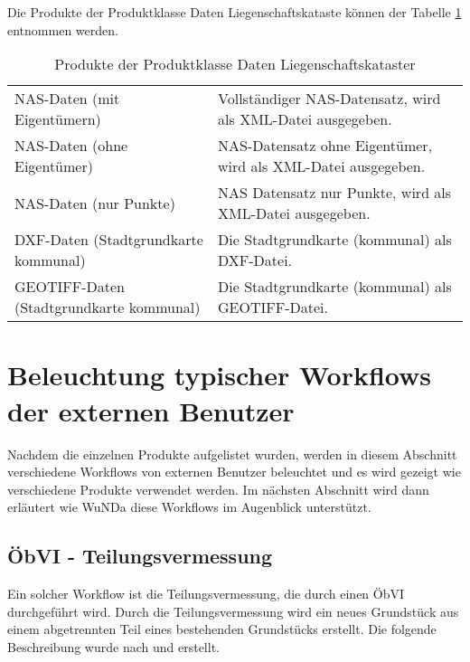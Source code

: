 Die Produkte der Produktklasse Daten Liegenschaftskataste können der Tabelle \ref{tab-daten-kataster} entnommen werden.
\begin{longtable}{|p{}|p{}|}
	\caption{Produkte der Produktklasse Daten Liegenschaftskataster} \label{tab-daten-kataster} \\
	\hline 
	\head{Produktname}  & \head{Beschreibung} \tabularnewline
	\hline 
	\endhead	
				
	\acs{NAS}-Daten (mit Eigentümern)
	&
	Vollständiger \acs{NAS}-Datensatz, wird als \acs{XML}-Datei ausgegeben. \\
	\hline
	\acs{NAS}-Daten (ohne Eigentümer)
	&
	\acs{NAS}-Datensatz ohne Eigentümer, wird als \acs{XML}-Datei ausgegeben. \\
	\hline
	\acs{NAS}-Daten (nur Punkte)
	&
	\acs{NAS} Datensatz nur Punkte, wird als \acs{XML}-Datei ausgegeben. \\
	\hline
	\acs{DXF}-Daten (Stadtgrundkarte kommunal)
	&
	Die Stadtgrundkarte (kommunal) als \acs{DXF}-Datei.  \\
	\hline
	GEOTIFF-Daten (Stadtgrundkarte kommunal)
	&
	Die Stadtgrundkarte (kommunal) als GEOTIFF-Datei. \\
	\hline	
\end{longtable} 

\section{Beleuchtung typischer Workflows der externen Benutzer}
Nachdem die einzelnen Produkte aufgelistet wurden, werden in diesem Abschnitt verschiedene Workflows von externen Benutzer beleuchtet und es wird gezeigt wie verschiedene Produkte verwendet werden. Im nächsten Abschnitt wird dann erläutert wie \ac{WuNDa} diese Workflows im Augenblick unterstützt.


\subsection{ÖbVI - Teilungsvermessung}
Ein solcher Workflow ist die Teilungsvermessung, die durch einen \ac{ÖbVI} durchgeführt wird. Durch die Teilungsvermessung wird ein neues Grundstück aus einem abgetrennten Teil eines bestehenden Grundstücks erstellt. Die folgende Beschreibung wurde nach \autocite{klein-vermessung} und \autocite{jungemann-alltag} erstellt.

